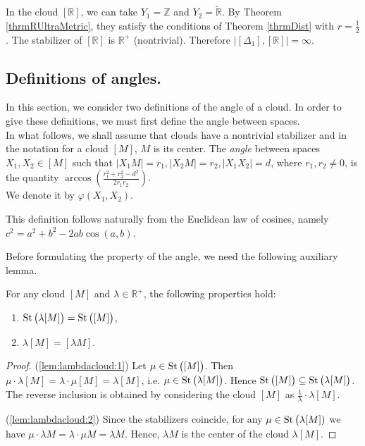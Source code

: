 \documentclass[leqno]{article}
\begin{document}
\begin{corollary}
    In the cloud $[\mathbb{R}]$, we can take $Y_{1} = \mathbb{Z}$ and
    $Y_{2} = \widetilde{\mathbb{R}}$. By Theorem
    \ref{thrmRUltraMetric}, they satisfy the conditions of Theorem
    \ref{thrmDist} with $r = \frac{1}{2}$. The stabilizer of
    $[\mathbb{R}]$ is $\mathbb{R}^{+}$ (nontrivial). Therefore
    $\big|[\Delta_{1}],[\mathbb{R}]\big| = \infty$.
\end{corollary}
\subsection{Definitions of angles.}
In this section, we consider two definitions of the angle of a cloud.
In order to
give these definitions, we must first define the angle between spaces.
\\
In what follows, we shall assume that clouds have a nontrivial stabilizer and in
the notation for a cloud \( [M] \), \( M \) is its center.
The \emph{angle} between spaces \( X_1, X_2 \in [M]\)  such that \( |X_1
M| = r_1, | X_2 M | =r_2, |X_1 X_2| = d\), where \( r_1,
r_2 \neq 0 \), is the quantity \( \arccos \left(\frac{r_1^2 +
r_{2}^2 - d^2}{2r_1r_2} \right)\).\\ We denote it by $\varphi(X_1, X_2) $.
\begin{remark}
    This definition follows naturally from the Euclidean law of cosines,
    namely \( c^{2} = a^2 + b^2 - 2ab\cos (a,b) \).
\end{remark}
Before formulating the property of the angle, we need the following auxiliary
lemma.
\begin{lemma}
    \label{lem:lambdacloud} For any cloud \( [M] \) and \( \lambda
    \in\mathbb{R}^+ \), the following properties hold{\textup{:}}
    \begin{enumerate}
        \item \( \operatorname{St}\big(\lambda [M]\big) = \operatorname{St}\big([M]\big)\),
            \label{lem:lambdacloud:1}
        \item \( \lambda [M] = [\lambda M] \).\label{lem:lambdacloud:2}
    \end{enumerate}
\end{lemma}
\begin{proof}
    (\ref{lem:lambdacloud:1}) Let \( \mu \in \operatorname{St}\big([M]\big) \). Then \( \mu
    \cdot \lambda [M] = \lambda \cdot \mu [M]= \lambda [M] \), i.e. \( \mu \in
    \operatorname{St}\big(\lambda [M]\big) \). Hence \( \operatorname{St}\big([M]\big) \subseteq
    \operatorname{St}\big(\lambda [M]\big) \). The reverse inclusion is obtained by
    considering
    the cloud \( [M] \) as \(\frac{1}{\lambda}\cdot \lambda [M] \).

    (\ref{lem:lambdacloud:2}) Since the stabilizers coincide, for any
    \( \mu \in  \operatorname{St}\big(\lambda [M])\) we have \( \mu \cdot \lambda M =
    \lambda \cdot \mu M = \lambda M \). Hence, \( \lambda M \) is the center
    of the cloud \( \lambda [M] \).
\end{proof}
\end{document}
